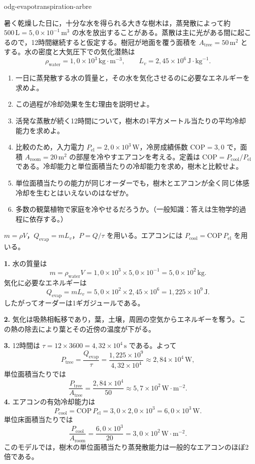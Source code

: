 \begin{exo}{odg-evapotranspiration-arbre}

暑く乾燥した日に，十分な水を得られる大きな樹木は，蒸発散によって約 $500\,\text{L}=5{,}0\times10^{-1}\,\text{m}^3$ の水を放出することがある。蒸散は主に光がある間に起こるので，12時間継続すると仮定する。樹冠が地面を覆う面積を $A_{\text{tree}}=50\,\text{m}^2$ とする。水の密度と大気圧下での気化潜熱は
\[
\rho_{\text{water}}=1{,}0\times10^3\,\text{kg}\!\cdot\!\text{m}^{-3},
\qquad L_v=2{,}45\times10^6\,\text{J}\!\cdot\!\text{kg}^{-1}.
\]
\begin{enumerate}
  \item 一日に蒸発散する水の質量と，その水を気化させるのに必要なエネルギーを求めよ。
  \item この過程が冷却効果を生む理由を説明せよ。
  \item 活発な蒸散が続く12時間について，樹木の1平方メートル当たりの平均冷却能力を求めよ。
  \item 比較のため，入力電力 $P_{\mathrm{el}}=2{,}0\times10^3\,\text{W}$，冷房成績係数 $\mathrm{COP}=3{,}0$ で，面積 $A_{\text{room}}=20\,\text{m}^2$ の部屋を冷やすエアコンを考える。定義は $\mathrm{COP}=P_{\text{cool}}/P_{\mathrm{el}}$ である。冷却能力と単位面積当たりの冷却能力を求め，樹木と比較せよ。
  \item 単位面積当たりの能力が同じオーダーでも，樹木とエアコンが全く同じ体感冷却を生むとはいえないのはなぜか。
  \item 多数の観葉植物で家庭を冷やせるだろうか。（一般知識：答えは生物学的過程に依存する。）
\end{enumerate}
\begin{indication}
$m=\rho V$，$Q_{\mathrm{evap}}=mL_v$，$P=Q/\tau$ を用いる。エアコンには $P_{\text{cool}}=\mathrm{COP}\,P_{\mathrm{el}}$ を用いる。
\end{indication}
\begin{solution}
\textbf{1.} 水の質量は
\[
m=\rho_{\text{water}}V=1{,}0\times10^3\times5{,}0\times10^{-1}
=5{,}0\times10^2\,\text{kg}.
\]
気化に必要なエネルギーは
\[
Q_{\mathrm{evap}}=mL_v=5{,}0\times10^2\times2{,}45\times10^6
=1{,}225\times10^9\,\text{J}.
\]
したがってオーダーは1ギガジュールである。

\textbf{2.} 気化は吸熱相転移であり，葉，土壌，周囲の空気からエネルギーを奪う。この熱の除去により葉とその近傍の温度が下がる。

\textbf{3.} 12時間は $\tau=12\times3600=4{,}32\times10^4\,\text{s}$ である。よって
\[
P_{\text{tree}}=\frac{Q_{\mathrm{evap}}}{\tau}
=\frac{1{,}225\times10^9}{4{,}32\times10^4}\approx2{,}84\times10^4\,\text{W},
\]
単位面積当たりでは
\[
\frac{P_{\text{tree}}}{A_{\text{tree}}}
=\frac{2{,}84\times10^4}{50}\approx5{,}7\times10^2\,\text{W}\!\cdot\!\text{m}^{-2}.
\]
\textbf{4.} エアコンの有効冷却能力は
\[
P_{\text{cool}}=\mathrm{COP}\,P_{\mathrm{el}}
=3{,}0\times2{,}0\times10^3=6{,}0\times10^3\,\text{W}.
\]
単位床面積当たりでは
\[
\frac{P_{\text{cool}}}{A_{\text{room}}}
=\frac{6{,}0\times10^3}{20}=3{,}0\times10^2\,\text{W}\!\cdot\!\text{m}^{-2}.
\]
このモデルでは，樹木の単位面積当たり蒸発散能力は一般的なエアコンのほぼ2倍である。


\end{solution}
\end{exo}
